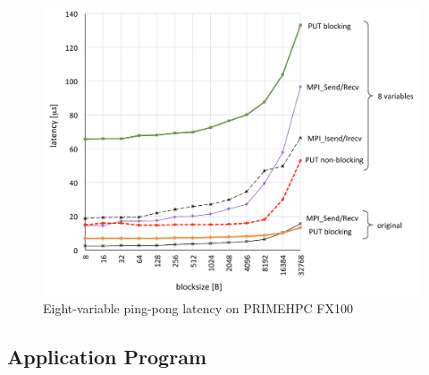 \begin{figure}[bth]
  \begin{center}
    \mbox{\includegraphics[scale=0.45]{graphs/8var-latency-2.pdf}}
    \caption{Eight-variable ping-pong latency on PRIMEHPC FX100}\label{fig:8var-pingpong}
   \end{center}
\end{figure}
    



\subsection{Application Program}

